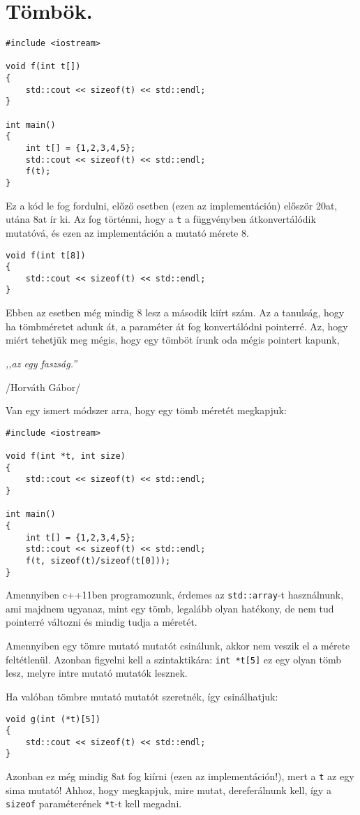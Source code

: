 \documentclass[a4paper,11.5pt]{article}
\begin{document}
	\section{Tömbök.}
	\begin{lstlisting}
#include <iostream>

void f(int t[])
{
	std::cout << sizeof(t) << std::endl;
}

int main()
{
	int t[] = {1,2,3,4,5};
	std::cout << sizeof(t) << std::endl;
	f(t);
}
	\end{lstlisting}
	Ez a kód le fog fordulni, előző esetben (ezen az implementáción) először 20at, utána 8at ír ki. Az fog történni, hogy a \texttt{t} a függvényben átkonvertálódik mutatóvá, és ezen az implementáción a mutató mérete 8.
	\begin{lstlisting}
void f(int t[8])
{
	std::cout << sizeof(t) << std::endl;
}
	\end{lstlisting}
	Ebben az esetben még mindig 8 lesz a második kiírt szám. Az a tanulság, hogy ha tömbméretet adunk át, a paraméter át fog konvertálódni pointerré. Az, hogy miért tehetjük meg mégis, hogy egy tömböt írunk oda mégis pointert kapunk, 
	\begin{center}
		\textit{,,az egy faszság.''}
		
		/Horváth Gábor/
	\end{center}
	Van egy ismert módszer arra, hogy egy tömb méretét megkapjuk:
	\begin{lstlisting}
#include <iostream>

void f(int *t, int size)
{
	std::cout << sizeof(t) << std::endl;
}

int main()
{
	int t[] = {1,2,3,4,5};
	std::cout << sizeof(t) << std::endl;
	f(t, sizeof(t)/sizeof(t[0]));
}
	\end{lstlisting}
	\begin{note}
		Amennyiben c++11ben programozunk, érdemes az \texttt{std::array}-t használnunk, ami majdnem ugyanaz, mint egy tömb, legalább olyan hatékony, de nem tud pointerré változni és mindig tudja a méretét.
	\end{note}
	Amennyiben egy tömre mutató mutatót csinálunk, akkor nem veszik el a mérete feltétlenül. Azonban figyelni kell a szintaktikára: \texttt{int *t[5]} ez egy olyan tömb lesz, melyre intre mutató mutatók lesznek.
	
	\medskip
	Ha valóban tömbre mutató mutatót szeretnék, így csinálhatjuk:
	\begin{lstlisting}
void g(int (*t)[5])
{
	std::cout << sizeof(t) << std::endl;
}
	\end{lstlisting}
	Azonban ez még mindig 8at fog kiírni (ezen az implementáción!), mert a \texttt{t} az egy sima mutató! Ahhoz, hogy megkapjuk, mire mutat, dereferálnunk kell, így a \texttt{sizeof} paraméterének \texttt{*t}-t kell megadni.
	\medskip
	
\end{document}
